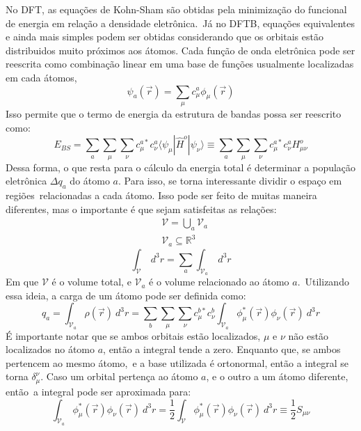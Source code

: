 No DFT, as equações de Kohn-Sham são obtidas pela minimização do funcional de energia em relação a densidade eletrônica.\
Já no DFTB, equações equivalentes e ainda mais simples podem ser obtidas considerando que os orbitais estão distribuidos muito próximos aos átomos.
Cada função de onda eletrônica pode ser reescrita como combinação linear em uma base de funções usualmente localizadas em cada átomos,
\begin{equation}
    \psi_a(\vec{r}) = \sum_\mu c_\mu^a \phi_\mu(\vec{r})
\end{equation}
Isso permite que o termo de energia da estrutura de bandas possa ser reescrito como:
\begin{equation}
    E_{BS} = \sum_a\sum_\mu\sum_\nu c_\mu^{a*}c_\nu^a \langle \psi_\mu | \hat H^o |\psi_\nu \rangle \equiv \sum_a\sum_\mu\sum_\nu c_\mu^{a*}c_\nu^a H^o_{\mu \nu}
\end{equation}
Dessa forma, o que resta para o cálculo da energia total é determinar a população eletrônica $\Delta q_a$ do átomo $a$. Para isso, se torna interessante dividir o espaço em regiões\
relacionadas a cada átomo. Isso pode ser feito de muitas maneira diferentes, mas o importante é que sejam satisfeitas as relações:
\begin{equation}
\begin{aligned}
&\mathcal{V} = \bigcup_{a} \mathcal{V}_a \\
&\mathcal{V}_a \subseteq \mathbb{R}^3
\end{aligned}
\end{equation}
\begin{equation}
    \int_\mathcal{V} ~d^3r = \sum_a \int_{\mathcal{V}_a} ~d^3r
\end{equation}
Em que $\mathcal{V}$ é o volume total, e $\mathcal{V}_a$ é o volume relacionado ao átomo $a$.\
Utilizando essa ideia, a carga de um átomo pode ser definida como:
\begin{equation}
    q_a = \int_{\mathcal{V}_a} \rho(\vec{r}) ~d^3 r = \sum_b \sum_\mu\sum_\nu c_\mu^{b*}c_\nu^b \int_{\mathcal{V}_a} \phi_\mu^{*}(\vec{r}) \phi_\nu(\vec{r}) ~d^3 r
\end{equation}
É importante notar que se ambos orbitais estão localizados, $\mu$ e $\nu$ não estão localizados no átomo $a$, então a integral tende a zero. Enquanto que, se ambos pertencem ao mesmo átomo,\
e a base utilizada é ortonormal, então a integral se torna $\delta_\mu^\nu$. Caso um orbital pertença ao átomo $a$, e o outro a um átomo diferente, então\
a integral pode ser aproximada para:
\begin{equation}
    \int_{\mathcal{V}_a} \phi_\mu^{*}(\vec{r}) \phi_\nu(\vec{r}) ~d^3 r = \frac{1}{2}\int_{\mathcal{V}} \phi_\mu^{*}(\vec{r}) \phi_\nu(\vec{r}) ~d^3 r \equiv \frac{1}{2} S_{\mu \nu}
\end{equation}
